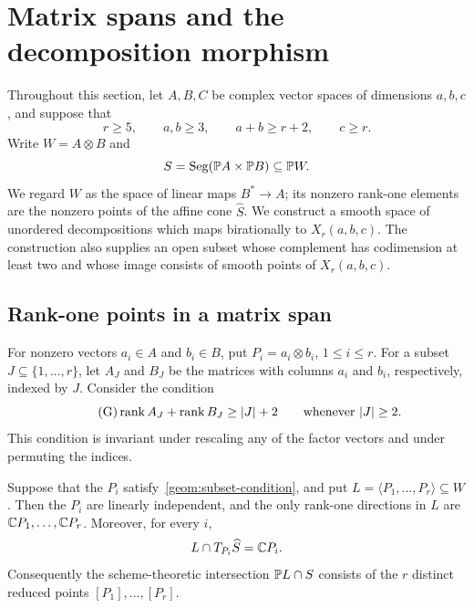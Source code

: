 \section{Matrix spans and the decomposition morphism}
\label{geom:section}

Throughout this section, let $A,B,C$ be complex vector spaces of
dimensions $a,b,c$, and suppose that
\begin{equation}\label{geom:dimensions}
 r\geq5,\qquad a,b\geq3,\qquad a+b\geq r+2,\qquad c\geq r.
\end{equation}
Write $W=A\otimes B$ and
\[
 S=\operatorname{Seg}(\mathbb P A\times\mathbb P B)\subseteq\mathbb P W.
\]
We regard $W$ as the space of linear maps $B^*\to A$; its nonzero
rank-one elements are the nonzero points of the affine cone
$\widehat S$. We construct a smooth space of unordered decompositions
which maps birationally to $X_r(a,b,c)$. The construction also supplies
an open subset whose complement has codimension at least two and whose
image consists of smooth points of $X_r(a,b,c)$.

\subsection{Rank-one points in a matrix span}
\label{geom:matrix-spans}

For nonzero vectors $a_i\in A$ and $b_i\in B$, put
$P_i=a_i\otimes b_i$, $1\leq i\leq r$. For a subset
$J\subseteq\{1,\ldots,r\}$, let $A_J$ and $B_J$ be the matrices with
columns $a_i$ and $b_i$, respectively, indexed by $J$. Consider the
condition
\begin{equation}\label{geom:subset-condition}\tag{G}
 \operatorname{rank} A_J+\operatorname{rank} B_J\geq |J|+2
 \qquad\text{whenever }|J|\geq2.
\end{equation}
This condition is invariant under rescaling any of the factor vectors
and under permuting the indices.

\begin{lemma}\label{geom:matrix-criterion}
Suppose that the $P_i$ satisfy~\eqref{geom:subset-condition}, and put
$L=\langle P_1,\ldots,P_r\rangle\subseteq W$. Then the $P_i$ are
linearly independent, and the only rank-one directions in $L$ are
$\mathbb C P_1,\ldots,\mathbb C P_r$. Moreover, for every $i$,
\begin{equation}\label{geom:tangent-intersection}
 L\cap T_{P_i}\widehat S=\mathbb C P_i.
\end{equation}
Consequently the scheme-theoretic intersection $\mathbb P L\cap S$ consists
of the $r$ distinct reduced points $[P_1],\ldots,[P_r]$.
\end{lemma}

